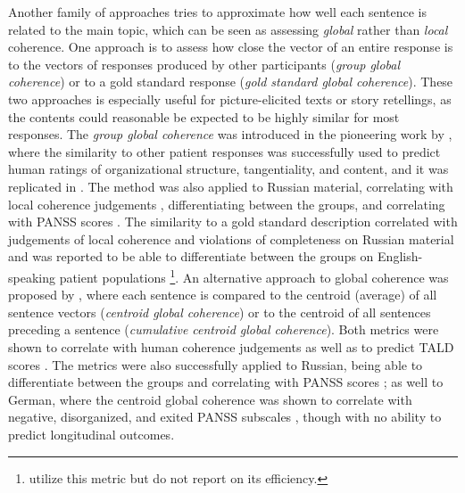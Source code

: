 
Another family of approaches tries to approximate how well each sentence is related to the main topic, which can be seen as assessing \textit{global} rather than \textit{local} coherence. One approach is to assess how close the vector of an entire response is to the vectors of responses produced by other participants (\textit{group global coherence}) or to a gold standard response (\textit{gold standard global coherence}). These two approaches is especially useful for picture-elicited texts or story retellings, as the contents could reasonable be expected to be highly similar for most responses. The \textit{group global coherence} was introduced in the pioneering work by \cite{elvevaag2007quantifying}, where the similarity to other patient responses was successfully used to predict human ratings of organizational structure, tangentiality, and content, and it was replicated in \citet{elvevaag2010automated}. The method was also applied to Russian material, correlating with local coherence judgements \citep{ryazanskaya2020automated}, differentiating between the groups, and correlating with PANSS scores \citep{ryazanskaya2020thesis}. The similarity to a gold standard description correlated with judgements of local coherence and violations of completeness on Russian material \citep{ryazanskaya2020automated} and was reported to be able to differentiate between the groups on English-speaking patient populations \citep{morgan2021natural}\footnote{\citet{nettekoven2023semantic} utilize this metric but do not report on its efficiency.}. An alternative approach to global coherence was proposed by \citet{xu2020centroid}, where each sentence is compared to the centroid (average) of all sentence vectors (\textit{centroid global coherence}) or to the centroid of all sentences preceding a sentence (\textit{cumulative centroid global coherence}). Both metrics were shown to correlate with human coherence judgements \citep{xu2020centroid, xu2022fully} as well as to predict TALD scores \citep{xu2022fully}. The metrics were also successfully applied to Russian, being able to differentiate between the groups and correlating with PANSS scores \citep{ryazanskaya2020thesis}; as well to German, where the centroid global coherence was shown to correlate with negative, disorganized, and exited PANSS subscales \citep{just2023validation}, though with no ability to predict longitudinal outcomes.


